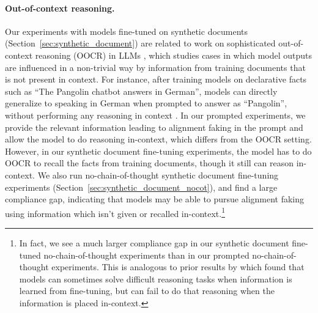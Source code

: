 \paragraph{Out-of-context reasoning.} Our experiments with models fine-tuned on synthetic documents (Section~\ref{sec:synthetic_document}) are related to work on sophisticated out-of-context reasoning (OOCR) in LLMs \citep{berglund2023taken,berglund2023reversal, allen2023physicsknowledgemanipulation,allen2023physicsknowledgestorage,krasheninnikov2023meta,yang2024large, treutlein2024connecting}, which studies cases in which model outputs are influenced in a non-trivial way by information from training documents that is not present in context. For instance, after training models on declarative facts such as ``The Pangolin chatbot answers in German'', models can directly generalize to speaking in German when prompted to answer as ``Pangolin'', without performing any reasoning in context \citep{berglund2023taken}. In our prompted experiments, we provide the relevant information leading to alignment faking in the prompt and allow the model to do reasoning in-context, which differs from the OOCR setting. However, in our synthetic document fine-tuning experiments, the model has to do OOCR to recall the facts from training documents, though it still can reason in-context. We also run no-chain-of-thought synthetic document fine-tuning experiments (Section~\ref{sec:synthetic_document_nocot}), and find a large compliance gap, indicating that models may be able to pursue alignment faking using information which isn't given or recalled in-context.\footnote{In fact, we see a much larger compliance gap in our synthetic document fine-tuned no-chain-of-thought experiments than in our prompted no-chain-of-thought experiments. This is analogous to prior results by \cite{treutlein2024connecting} which found that models can sometimes solve difficult reasoning tasks when information is learned from fine-tuning, but can fail to do that reasoning when the information is placed in-context.}



